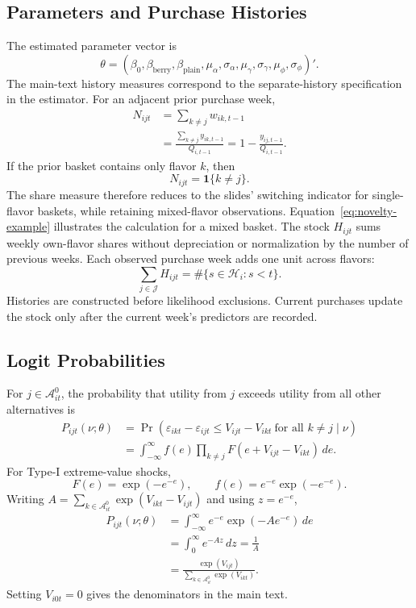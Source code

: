 \documentclass[12pt]{article}
\theoremstyle{definition}
\theoremstyle{remark}
\begin{document}
\subsection{Parameters and Purchase Histories}
The estimated parameter vector is
\begin{equation}
 \theta=(\beta_0,\beta_{\mathrm{berry}},\beta_{\mathrm{plain}},
 \mu_\alpha,\sigma_\alpha,\mu_\gamma,\sigma_\gamma,\mu_\phi,\sigma_\phi)'.
\end{equation}
The main-text history measures correspond to the separate-history specification
in the estimator. For an adjacent prior purchase week,
\begin{align}
 N_{ijt}&=\sum_{k\ne j}w_{ik,t-1}\\
 &=\frac{\sum_{k\ne j}y_{ik,t-1}}{Q_{i,t-1}}
 =1-\frac{y_{ij,t-1}}{Q_{i,t-1}}.
\end{align}
If the prior basket contains only flavor $k$, then
\begin{equation}
 N_{ijt}=\mathbf{1}\{k\ne j\}.
\end{equation}
The share measure therefore reduces to the slides' switching indicator for
single-flavor baskets, while retaining mixed-flavor observations.
Equation~\eqref{eq:novelty-example} illustrates the calculation for a mixed basket.
The stock $H_{ijt}$ sums weekly own-flavor shares without depreciation or
normalization by the number of previous weeks. Each observed purchase week adds
one unit across flavors:
\begin{equation}
 \sum_{j\in\mathcal J}H_{ijt}
 =\#\{s\in\mathcal H_i:s<t\}.
\end{equation}
Histories are constructed before likelihood exclusions. Current purchases update
the stock only after the current week's predictors are recorded.

\subsection{Logit Probabilities}
For $j\in\mathcal A_{it}^0$, the probability that utility from $j$ exceeds utility
from all other alternatives is
\begin{align}
 P_{ijt}(\nu;\theta)
 &=\Pr\!\left(\varepsilon_{ikt}-\varepsilon_{ijt}
 \le V_{ijt}-V_{ikt}\ \text{for all }k\ne j\mid\nu\right)\\
 &=\int_{-\infty}^{\infty} f(e)
 \prod_{k\ne j}F(e+V_{ijt}-V_{ikt})\,de.
\end{align}
For Type-I extreme-value shocks,
\begin{equation}
 F(e)=\exp(-e^{-e}),\qquad f(e)=e^{-e}\exp(-e^{-e}).
\end{equation}
Writing $A=\sum_{k\in\mathcal A_{it}^0}\exp(V_{ikt}-V_{ijt})$ and using $z=e^{-e}$,
\begin{align}
 P_{ijt}(\nu;\theta)
 &=\int_{-\infty}^{\infty}e^{-e}\exp(-Ae^{-e})\,de\\
 &=\int_0^\infty e^{-Az}\,dz
 =\frac{1}{A}\\
 &=\frac{\exp(V_{ijt})}{\sum_{k\in\mathcal A_{it}^0}\exp(V_{ikt})}.
\end{align}
Setting $V_{i0t}=0$ gives the denominators in the main text.
\end{document}
